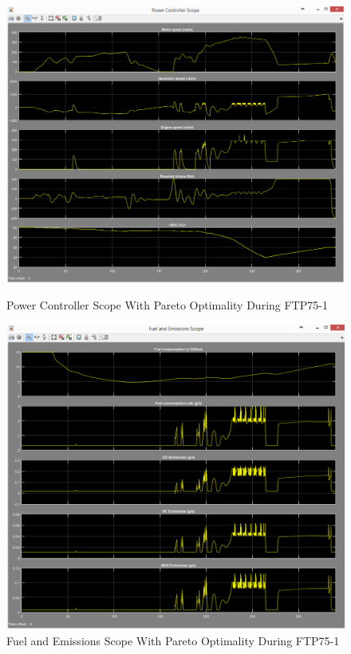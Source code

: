 \begin{figure}[hp]
\centering
\includegraphics[scale=0.46]{figures/Pareto/FTP75-1/powerController30Juni}
\caption{Power Controller Scope With Pareto Optimality During FTP75-1}
\label{fig:pcpo1}
\includegraphics[scale=0.49]{figures/Pareto/FTP75-1/fuelEmissions30Juni}
\caption{Fuel and Emissions Scope With Pareto Optimality During FTP75-1}
\label{fig:fepo1}
\end{figure}


